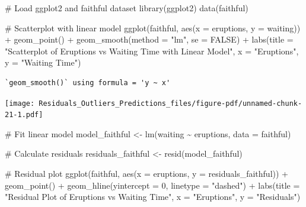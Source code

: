 \documentclass[
  letterpaper,
  DIV=11,
  numbers=noendperiod]{scrreprt}
\newenvironment{Shaded}{\begin{snugshade}}{\end{snugshade}}
\newcommand{\AttributeTok}[1]{\textcolor[rgb]{0.40,0.45,0.13}{#1}}
\newcommand{\CommentTok}[1]{\textcolor[rgb]{0.37,0.37,0.37}{#1}}
\newcommand{\ConstantTok}[1]{\textcolor[rgb]{0.56,0.35,0.01}{#1}}
\newcommand{\DecValTok}[1]{\textcolor[rgb]{0.68,0.00,0.00}{#1}}
\newcommand{\FunctionTok}[1]{\textcolor[rgb]{0.28,0.35,0.67}{#1}}
\newcommand{\NormalTok}[1]{\textcolor[rgb]{0.00,0.23,0.31}{#1}}
\newcommand{\OtherTok}[1]{\textcolor[rgb]{0.00,0.23,0.31}{#1}}
\newcommand{\SpecialCharTok}[1]{\textcolor[rgb]{0.37,0.37,0.37}{#1}}
\newcommand{\StringTok}[1]{\textcolor[rgb]{0.13,0.47,0.30}{#1}}
\begin{document}
\begin{Shaded}
\begin{Highlighting}[]
\CommentTok{\# Load ggplot2 and faithful dataset}
\FunctionTok{library}\NormalTok{(ggplot2)}
\FunctionTok{data}\NormalTok{(faithful)}

\CommentTok{\# Scatterplot with linear model}
\FunctionTok{ggplot}\NormalTok{(faithful, }\FunctionTok{aes}\NormalTok{(}\AttributeTok{x =}\NormalTok{ eruptions, }\AttributeTok{y =}\NormalTok{ waiting)) }\SpecialCharTok{+}
  \FunctionTok{geom\_point}\NormalTok{() }\SpecialCharTok{+}
  \FunctionTok{geom\_smooth}\NormalTok{(}\AttributeTok{method =} \StringTok{"lm"}\NormalTok{, }\AttributeTok{se =} \ConstantTok{FALSE}\NormalTok{) }\SpecialCharTok{+}
  \FunctionTok{labs}\NormalTok{(}\AttributeTok{title =} \StringTok{"Scatterplot of Eruptions vs Waiting Time with Linear Model"}\NormalTok{, }\AttributeTok{x =} \StringTok{"Eruptions"}\NormalTok{, }\AttributeTok{y =} \StringTok{"Waiting Time"}\NormalTok{)}
\end{Highlighting}
\end{Shaded}

\begin{verbatim}
`geom_smooth()` using formula = 'y ~ x'
\end{verbatim}

\texttt{[image: Residuals\_Outliers\_Predictions\_files/figure-pdf/unnamed-chunk-21-1.pdf]}

\begin{Shaded}
\begin{Highlighting}[]
\CommentTok{\# Fit linear model}
\NormalTok{model\_faithful }\OtherTok{\textless{}{-}} \FunctionTok{lm}\NormalTok{(waiting }\SpecialCharTok{\textasciitilde{}}\NormalTok{ eruptions, }\AttributeTok{data =}\NormalTok{ faithful)}

\CommentTok{\# Calculate residuals}
\NormalTok{residuals\_faithful }\OtherTok{\textless{}{-}} \FunctionTok{resid}\NormalTok{(model\_faithful)}

\CommentTok{\# Residual plot}
\FunctionTok{ggplot}\NormalTok{(faithful, }\FunctionTok{aes}\NormalTok{(}\AttributeTok{x =}\NormalTok{ eruptions, }\AttributeTok{y =}\NormalTok{ residuals\_faithful)) }\SpecialCharTok{+}
  \FunctionTok{geom\_point}\NormalTok{() }\SpecialCharTok{+}
  \FunctionTok{geom\_hline}\NormalTok{(}\AttributeTok{yintercept =} \DecValTok{0}\NormalTok{, }\AttributeTok{linetype =} \StringTok{"dashed"}\NormalTok{) }\SpecialCharTok{+}
  \FunctionTok{labs}\NormalTok{(}\AttributeTok{title =} \StringTok{"Residual Plot of Eruptions vs Waiting Time"}\NormalTok{, }\AttributeTok{x =} \StringTok{"Eruptions"}\NormalTok{, }\AttributeTok{y =} \StringTok{"Residuals"}\NormalTok{)}
\end{Highlighting}
\end{Shaded}
\end{document}
